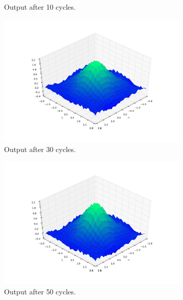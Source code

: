 \documentclass[a4paper,10pt]{article}
\numberwithin{equation}{section} %
\numberwithin{figure}{section} %
\numberwithin{table}{section} %
\theoremstyle{mytheor}
\begin{document}
\begin{enumerate}
\begin{figure}[h!]
\begin{subfigure}[b]{0.45\textwidth}
				\caption{Output after 10 cycles.}
			\end{subfigure}
			\begin{subfigure}[b]{0.45\textwidth}
				\includegraphics[width=\textwidth]{ex2_4_30.png}\vspace{-0.5cm}
				\caption{Output after 30 cycles.}
			\end{subfigure}
			\begin{subfigure}[b]{0.45\textwidth}
				\includegraphics[width=\textwidth]{ex2_4_50.png}\vspace{-0.5cm}
				\caption{Output after 50 cycles.}
			\end{subfigure}
			\begin{subfigure}[b]{0.45\textwidth}

\end{subfigure}
\end{figure}
\end{enumerate}
\end{document}
